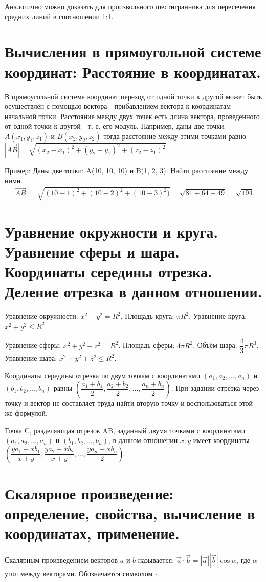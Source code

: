 \documentclass[12pt]{article}
\begin{document}
\begin{sloppypar}
    Аналогично можно доказать для произвольного шестигранника для пересечения средних линий в соотношении 1:1.

    \section{Вычисления в прямоугольной системе координат: Расстояние в координатах.}
    В прямоугольной системе координат переход от одной точки к другой может быть осуществлён с помощью вектора - прибавлением вектора к координатам начальной точки. Расстояние между двух точек есть длина вектора, проведённого от одной точки к другой - т. е. его модуль. Например, даны две точки: $A(x_1, y_1, z_1)$ и $B(x_2, y_2, z_2)$ тогда расстояние между этими точками равно $|\overrightarrow{AB}| = \sqrt{(x_2 - x_1)^2 + (y_2 - y_1)^2 + (z_2 - z_1)^2}$

    Пример:
    Даны две точки: A(10, 10, 10) и B(1, 2, 3). Найти расстояние между ними.
    \[
        |\overrightarrow{AB}| = \sqrt{(10 - 1)^2 + (10 - 2)^2 + (10 - 3)^2)} = \sqrt{81 + 64 + 49} = \sqrt{194}
    \]

    \section{Уравнение окружности и круга. Уравнение сферы и шара. Координаты середины отрезка. Деление отрезка в данном отношении.}

    Уравнение окружности: $x^2 + y^2 = R^2$. Площадь круга: $\pi R^2$. Уравнение круга: $x^2 + y^2 \leq R^2$.

    Уравнение сферы: $x^2 + y^2 + z^2 = R^2$. Площадь сферы: $4\pi R^2$. Объём шара: $\dfrac{4}{3}\pi R^3$. Уравнение шара: $x^2 + y^2 + z^2 \leq R^2$.

    Координаты середины отрезка по двум точкам с координатами $(a_1, a_2, ..., a_n)$ и $(b_1, b_2, ..., b_n)$ равны $\left(\dfrac{a_1 + b_1}{2}, \dfrac{a_2 + b_2}{2}, ..., \dfrac{a_n + b_n}{2}\right)$. При задании отрезка через точку и вектор не составляет труда найти вторую точку и воспользоваться этой же формулой.

    Точка C, разделяющая отрезок AB, заданный двумя точками с координатами $(a_1, a_2, ..., a_n)$ и $(b_1, b_2, ..., b_n)$, в данном отношении $x:y$ имеет координаты $\left(\dfrac{ya_1 + xb_1}{x + y}, \dfrac{ya_2 + xb_2}{x + y}, ..., \dfrac{ya_n + xb_n}{2}\right)$.

    \section{Скалярное произведение: определение, свойства, вычисление в координатах, применение.}
    Скалярным произведением векторов $a$ и $b$ называется: $\overrightarrow{a} \cdot \overrightarrow{b} = |\overrightarrow{a}||\overrightarrow{b}|\cos \alpha$, где $\alpha$ - угол между векторами. Обозначается символом $\cdot$.


\end{sloppypar}
\end{document}

